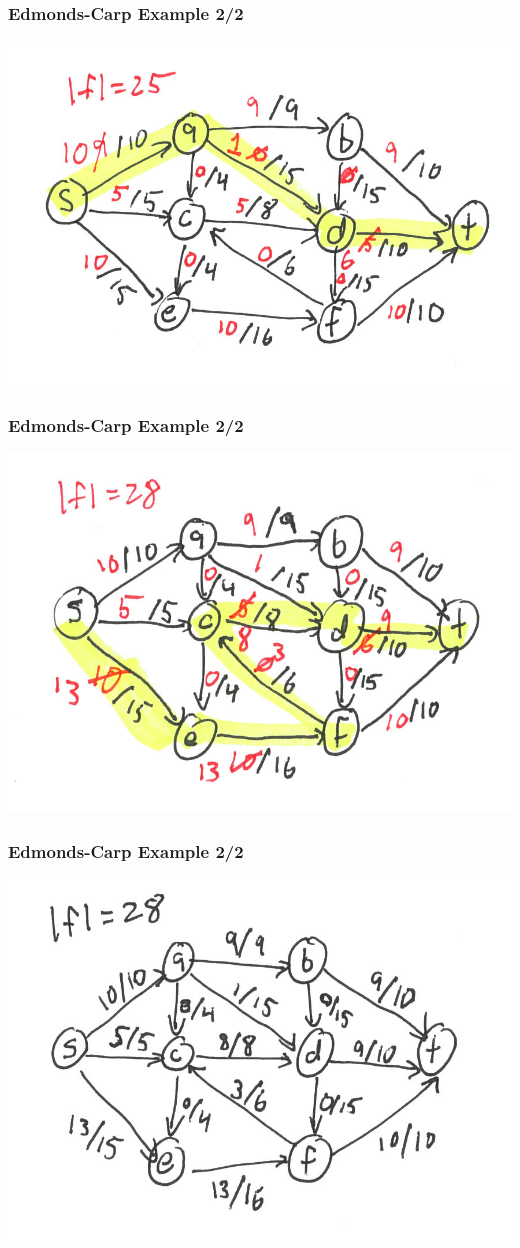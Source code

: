 \documentclass[10pt,aspectratio=169]{beamer}
\begin{document}
\begin{frame} \frametitle{Edmonds-Carp Example 2/2}
\begin{center}
  \includegraphics[scale=1]{ek-2-5.png}
\end{center}
\end{frame}

\begin{frame} \frametitle{Edmonds-Carp Example 2/2}
\begin{center}
  \includegraphics[scale=1]{ek-2-6.png}
\end{center}
\end{frame}

\begin{frame} \frametitle{Edmonds-Carp Example 2/2}
\begin{center}
  \includegraphics[scale=1]{ek-2-7.png}
\end{center}
\end{frame}
\end{document}
